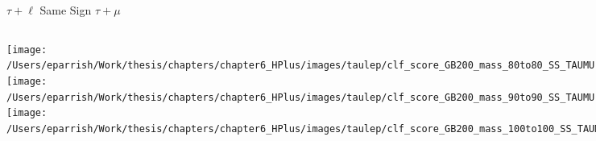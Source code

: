 \documentclass[aspectratio=169,xcolor=table]{beamer}
\begin{document}
    \begin{frame}[t]{$\tau+\ell$ Same Sign $\tau+\mu$}
      \begin{columns}[t]
          \texttt{[image: /Users/eparrish/Work/thesis/chapters/chapter6\_HPlus/images/taulep/clf\_score\_GB200\_mass\_80to80\_SS\_TAUMU.png]}
          \texttt{[image: /Users/eparrish/Work/thesis/chapters/chapter6\_HPlus/images/taulep/clf\_score\_GB200\_mass\_90to90\_SS\_TAUMU.png]}
          \texttt{[image: /Users/eparrish/Work/thesis/chapters/chapter6\_HPlus/images/taulep/clf\_score\_GB200\_mass\_100to100\_SS\_TAUMU.png]}

          \texttt{[image: /Users/eparrish/Work/thesis/chapters/chapter6\_HPlus/images/taulep/clf\_score\_GB200\_mass\_110to110\_SS\_TAUMU.png]}
          \texttt{[image: /Users/eparrish/Work/thesis/chapters/chapter6\_HPlus/images/taulep/clf\_score\_GB200\_mass\_120to120\_SS\_TAUMU.png]}
          \texttt{[image: /Users/eparrish/Work/thesis/chapters/chapter6\_HPlus/images/taulep/clf\_score\_GB200\_mass\_130to130\_SS\_TAUMU.png]}
          \texttt{[image: /Users/eparrish/Work/thesis/chapters/chapter6\_HPlus/images/taulep/clf\_score\_GB200\_mass\_140to140\_SS\_TAUMU.png]}
          \texttt{[image: /Users/eparrish/Work/thesis/chapters/chapter6\_HPlus/images/taulep/clf\_score\_GB200\_mass\_150to150\_SS\_TAUMU.png]}
          \texttt{[image: /Users/eparrish/Work/thesis/chapters/chapter6\_HPlus/images/taulep/clf\_score\_GB200\_mass\_160to160\_SS\_TAUMU.png]}

          \texttt{[image: /Users/eparrish/Work/thesis/chapters/chapter6\_HPlus/images/taulep/clf\_score\_GB200\_mass\_170to170\_SS\_TAUMU.png]}
          \texttt{[image: /Users/eparrish/Work/thesis/chapters/chapter6\_HPlus/images/taulep/clf\_score\_GB200\_mass\_180to180\_SS\_TAUMU.png]}
          \texttt{[image: /Users/eparrish/Work/thesis/chapters/chapter6\_HPlus/images/taulep/clf\_score\_GB200\_mass\_190to190\_SS\_TAUMU.png]}

      \end{columns}
    \end{frame}
\end{document}
